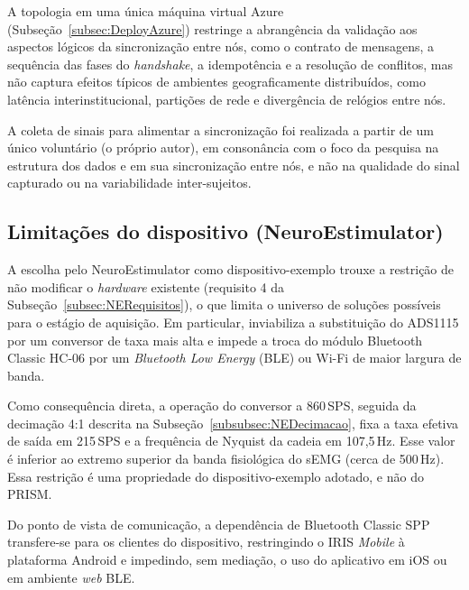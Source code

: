 A topologia em uma única máquina virtual Azure (Subseção~\ref{subsec:DeployAzure}) restringe a abrangência da validação aos aspectos lógicos da sincronização entre nós, como o contrato de mensagens, a sequência das fases do \textit{handshake}, a idempotência e a resolução de conflitos, mas não captura efeitos típicos de ambientes geograficamente distribuídos, como latência interinstitucional, partições de rede e divergência de relógios entre nós.

A coleta de sinais para alimentar a sincronização foi realizada a partir de um único voluntário (o próprio autor), em consonância com o foco da pesquisa na estrutura dos dados e em sua sincronização entre nós, e não na qualidade do sinal capturado ou na variabilidade inter-sujeitos.

\subsection{Limitações do dispositivo (NeuroEstimulator)}\label{subsec:limitacoesDispositivo}

A escolha pelo NeuroEstimulator como dispositivo-exemplo trouxe a restrição de não modificar o \textit{hardware} existente (requisito 4 da Subseção~\ref{subsec:NERequisitos}), o que limita o universo de soluções possíveis para o estágio de aquisição. Em particular, inviabiliza a substituição do ADS1115 por um conversor de taxa mais alta e impede a troca do módulo Bluetooth Classic HC-06 por um \textit{Bluetooth Low Energy} (BLE) ou Wi-Fi de maior largura de banda.

Como consequência direta, a operação do conversor a 860\,SPS, seguida da decimação 4:1 descrita na Subseção~\ref{subsubsec:NEDecimacao}, fixa a taxa efetiva de saída em 215\,SPS e a frequência de Nyquist da cadeia em 107,5\,Hz. Esse valor é inferior ao extremo superior  da banda fisiológica do sEMG (cerca de 500\,Hz)\cite{deluca1997use}. Essa restrição é uma propriedade do dispositivo-exemplo adotado, e não do PRISM.

Do ponto de vista de comunicação, a dependência de Bluetooth Classic SPP transfere-se para os clientes do dispositivo, restringindo o IRIS \textit{Mobile} à plataforma Android e impedindo, sem mediação, o uso do aplicativo em iOS ou em ambiente \textit{web} BLE.

